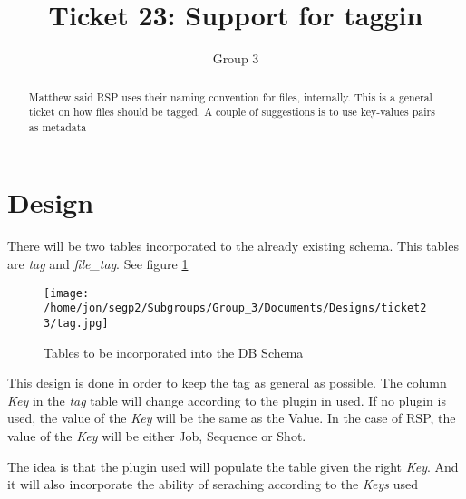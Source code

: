 \documentclass[a4paper,10pt]{article}
\title{Ticket 23: Support for taggin}
\author{Group 3}
\begin{document}
\maketitle

\begin{abstract}

Matthew said RSP uses their naming convention for files, internally.  This is a general ticket on how files should be tagged.  A couple of suggestions is to use key-values pairs as metadata

\end{abstract}

\section{Design}

There will be two tables incorporated to the already existing schema.  This tables are \textit{tag} and \textit{file\_tag}. See figure \ref{fig:TagsTables}

\begin{figure}[h]
 \centering
 \texttt{[image: /home/jon/segp2/Subgroups/Group\_3/Documents/Designs/ticket23/tag.jpg]}
 \caption{Tables to be incorporated into the DB Schema}
 \label{fig:TagsTables}
\end{figure}

This design is done in order to keep the tag as general as possible.  The column \textit{Key} in the \textit{tag} table will change according to the plugin in used.  If no plugin is used, the value of the \textit{Key} will be the same as the Value.  In the case of RSP, the value of the \textit{Key} will be either Job, Sequence or Shot.

The idea is that the plugin used will populate the table given the right \textit{Key}.  And it will also incorporate the ability of seraching according to the \textit{Keys} used
\end{document}
